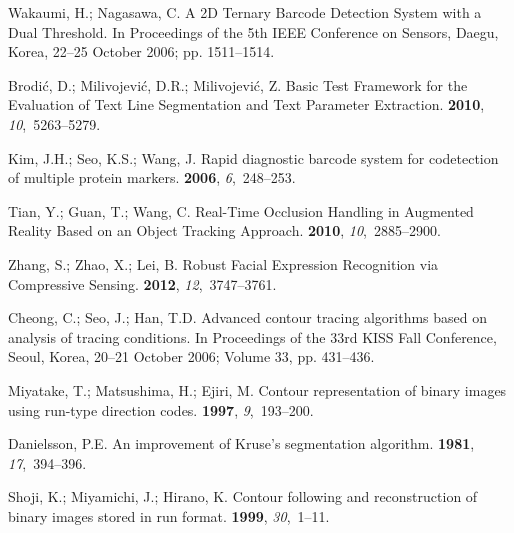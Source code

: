 \documentclass[sensors,article,accept,moreauthors,pdftex,10pt,a4paper]{mdpi}
\begin{document}
\begin{thebibliography}{999}
Wakaumi, H.; Nagasawa, C.
\newblock A 2D Ternary Barcode Detection System with a Dual Threshold.
\newblock In Proceedings of the 5th IEEE Conference on Sensors, Daegu, Korea, 22--25 October 2006; pp. 1511--1514.

Brodić, D.; Milivojević, D.R.; Milivojević, Z.
\newblock Basic Test Framework for the Evaluation of Text Line Segmentation and
 Text Parameter Extraction.
 {\bf 2010}, {\em 10},~5263--5279.

Kim, J.H.; Seo, K.S.; Wang, J.
\newblock Rapid diagnostic barcode system for codetection of multiple protein
 markers.
 {\bf 2006}, {\em 6},~248--253.

Tian, Y.; Guan, T.; Wang, C.
\newblock Real-Time Occlusion Handling in Augmented Reality Based on an Object
 Tracking Approach.
 {\bf 2010}, {\em 10},~2885--2900.

Zhang, S.; Zhao, X.; Lei, B.
\newblock Robust Facial Expression Recognition via Compressive Sensing.
 {\bf 2012}, {\em 12},~3747--3761.

Cheong, C.; Seo, J.; Han, T.D.
\newblock Advanced contour tracing algorithms based on analysis of tracing
 conditions.
\newblock In Proceedings of the 33rd KISS Fall Conference, Seoul, Korea, 20--21 October 2006; Volume
 33, pp. 431--436.

Miyatake, T.; Matsushima, H.; Ejiri, M.
\newblock Contour representation of binary images using run-type direction
 codes.
 {\bf 1997}, {\em 9},~193--200.

Danielsson, P.E.
\newblock An improvement of Kruse's segmentation algorithm.
 {\bf 1981}, {\em
 17},~394--396.

Shoji, K.; Miyamichi, J.; Hirano, K.
\newblock Contour following and reconstruction of binary images stored in run
 format.
 {\bf 1999}, {\em 30},~1--11.


\end{thebibliography}
\end{document}
